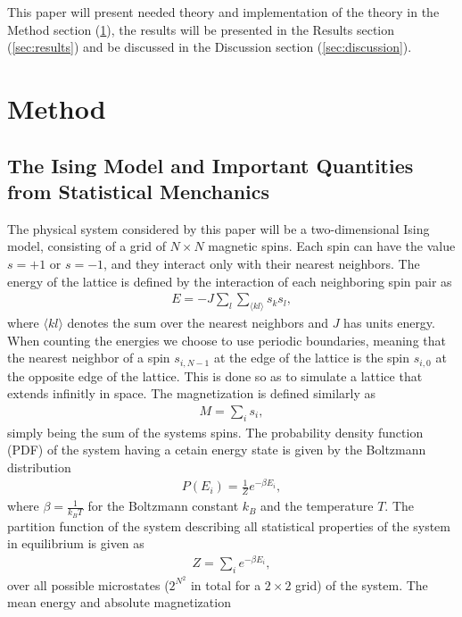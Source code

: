 \documentclass[twocolumn]{aastex62}
\begin{document}
This paper will present needed theory and implementation of the theory in the Method
section (\ref{sec:method}), the results will be presented in the Results section
(\ref{sec:results}) and be discussed in the Discussion section
(\ref{sec:discussion}).

\section{Method} \label{sec:method}
\subsection{The Ising Model and Important Quantities from Statistical Menchanics} \label{subsec:ising_model}
The physical system considered by this paper will be a two-dimensional Ising
model, consisting of a grid of $N\times N$ magnetic spins. Each spin can have
the value $s = +1$ or $s = -1$, and they interact only with their nearest neighbors.
The energy of the lattice is defined by the interaction of each neighboring
spin pair as
\begin{align}
	E = -J\sum_l\sum_{\langle kl\rangle} s_k s_l,
	\label{eq:energy}
\end{align}
where $\langle kl\rangle$ denotes the sum over the nearest neighbors and $J$ has units energy. When counting the
energies we choose to use periodic boundaries, meaning that the nearest
neighbor of a spin $s_{i,N-1}$ at the edge of the lattice is the spin $s_{i,0}$
at the opposite edge of the lattice. This is done so as to simulate a lattice
that extends infinitly in space.
The magnetization is defined similarly as
\begin{align}
	M = \sum_i s_i,
	\label{eq:magnetization}
\end{align}
simply being the sum of the systems spins. The probability density function (PDF) of the system having
a cetain energy state is given by the Boltzmann distribution
\begin{align}
	P(E_i) = \frac{1}{Z}e^{-\beta E_i},
\end{align}
where $\beta = \frac{1}{k_B T}$ for the Boltzmann constant $k_B$ and the
temperature $T$. The partition function of the system describing all statistical
properties of the system in equilibrium is given as
\begin{align}
	Z = \sum_{i} e^{-\beta E_i},
\end{align}
over all possible microstates ($2^{N^2}$ in total for a $2\times 2$ grid) of the system. The mean energy and absolute magnetization
\end{document}
